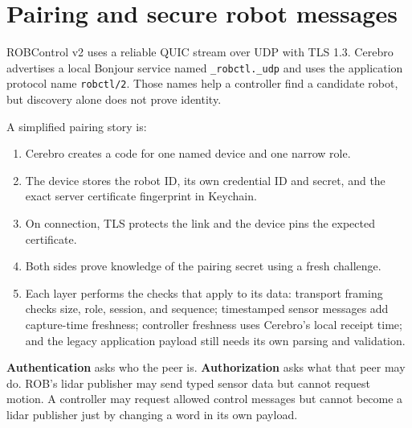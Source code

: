 \documentclass[11pt,openany]{book}
\begin{document}

\chapter{Pairing and secure robot messages}

ROBControl v2 uses a reliable QUIC stream over UDP with TLS 1.3. Cerebro advertises a local Bonjour service named \texttt{\_robctl.\_udp} and uses the application protocol name \texttt{robctl/2}. Those names help a controller find a candidate robot, but discovery alone does not prove identity.

A simplified pairing story is:

\begin{enumerate}
  \item Cerebro creates a code for one named device and one narrow role.
  \item The device stores the robot ID, its own credential ID and secret, and the exact server certificate fingerprint in Keychain.
  \item On connection, TLS protects the link and the device pins the expected certificate.
  \item Both sides prove knowledge of the pairing secret using a fresh challenge.
  \item Each layer performs the checks that apply to its data: transport framing checks size, role, session, and sequence; timestamped sensor messages add capture-time freshness; controller freshness uses Cerebro's local receipt time; and the legacy application payload still needs its own parsing and validation.
\end{enumerate}

\begin{conceptbox}
\textbf{Authentication} asks who the peer is. \textbf{Authorization} asks what that peer may do. ROB's lidar publisher may send typed sensor data but cannot request motion. A controller may request allowed control messages but cannot become a lidar publisher just by changing a word in its own payload.
\end{conceptbox}
\end{document}
